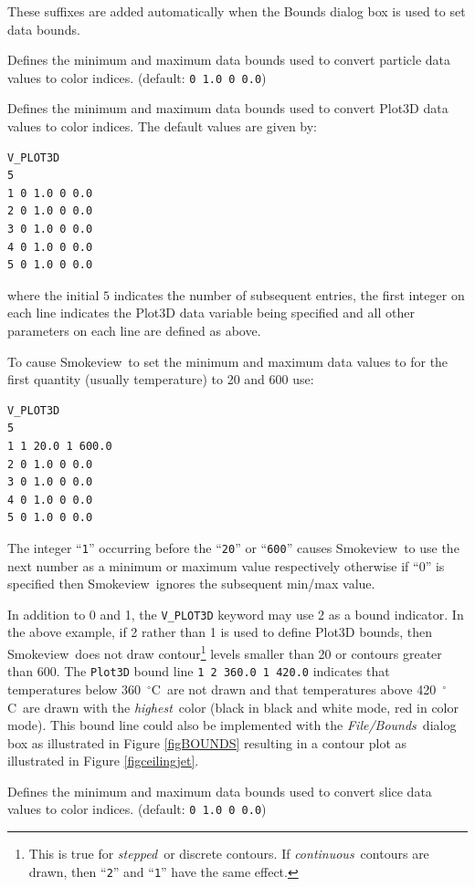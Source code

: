 \documentclass[11pt,twoside]{book}
\newcommand{\degC}{$^\circ$C}
\newcommand{\smokeview}{{Smokeview}}
\newcommand{\hitem}[1]{\item[{\bf #1} \hfill]}
\begin{document}
These suffixes are added automatically when the Bounds dialog box is used to set data bounds.

\hitem{V\_PARTICLES}Defines the minimum and maximum
data bounds used to convert particle data values to color indices.
(default: {\tt 0 1.0 0 0.0})

\hitem{V\_PLOT3D}Defines the minimum and maximum data bounds used
to convert Plot3D data values to color indices. The default values
are given by:
\begin{verbatim}
V_PLOT3D
5
1 0 1.0 0 0.0
2 0 1.0 0 0.0
3 0 1.0 0 0.0
4 0 1.0 0 0.0
5 0 1.0 0 0.0
\end{verbatim}
where the initial $5$ indicates the number of subsequent entries,
the first integer on each line indicates the Plot3D data variable
being specified and all other parameters on each line are defined
as above.

To cause \smokeview\ to set the minimum and maximum data values to for the first quantity
(usually temperature) to 20 and 600
use:

\begin{verbatim}
V_PLOT3D
5
1 1 20.0 1 600.0
2 0 1.0 0 0.0
3 0 1.0 0 0.0
4 0 1.0 0 0.0
5 0 1.0 0 0.0
\end{verbatim}
The integer ``{\tt 1}'' occurring before the ``{\tt 20}'' or ``{\tt 600}'' causes \smokeview\
to use the next number as a minimum or maximum value respectively otherwise if ``0'' is specified
then \smokeview\ ignores the subsequent min/max value.

In addition to 0 and 1, the {\tt V\_PLOT3D} keyword may use 2 as a
bound indicator. In the above example, if 2 rather than 1 is used
to define Plot3D bounds, then \smokeview\ does not draw
contour\footnote{This is true for {\em stepped}\ or discrete
contours.  If {\em continuous}\ contours are drawn, then ``{\tt 2}''
and ``{\tt 1}'' have the same effect. } levels smaller than 20 or
contours greater than 600. The {\tt Plot3D} bound line {\tt 1 2
360.0 1 420.0} indicates that temperatures below 360~\degC\ are
not drawn and that temperatures above 420~\degC\ are drawn with
the {\em highest}\ color (black in black and white mode, red in color
mode).  This bound line could also be implemented with the {\em File/Bounds}\  dialog box as illustrated in Figure \ref{figBOUNDS}
resulting in a contour plot as illustrated in Figure
\ref{figceilingjet}.


\hitem{V\_SLICE}Defines the minimum and maximum
data bounds used to convert slice data values to color indices.
(default: {\tt 0 1.0 0 0.0})
\end{document}

